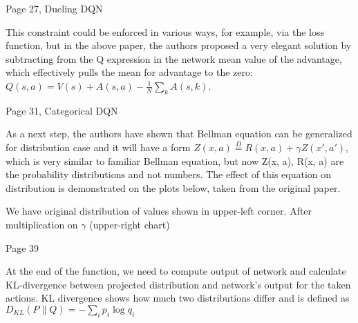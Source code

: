 Page 27, Dueling DQN

This constraint could be enforced in various ways, for example, via the loss
function, but in the above paper, the authors proposed a very elegant solution
by subtracting from the Q expression in the network mean value of the advantage,
which effectively pulls the mean for advantage to the zero:
\begin{math}Q(s, a) = V(s) + A(s, a) - \frac{1}{N}\sum_kA(s,k)\end{math}.

Page 31, Categorical DQN

As a next step, the authors have shown that Bellman equation can be generalized for
distribution case and it will have a form
\begin{math}Z(x, a)\stackrel{D}{=} R(x, a) + \gamma Z(x', a')\end{math}, which
is very similar to familiar Bellman equation, but now Z(x, a), R(x, a) are the
probability distributions and not numbers. The effect of this equation on
distribution is demonstrated on the plots below, taken from the original paper.

We have original distribution of values shown in upper-left corner. After
multiplication on \begin{math}\gamma\end{math} (upper-right chart)

Page 39

At the end of the function, we need to compute output of network and calculate
KL-divergence between projected distribution and network’s output for the taken
actions. KL divergence shows how much two distributions differ and is defined as
\begin{math}D_{KL}(P\|Q) = -\sum_i p_i\log q_i\end{math}


